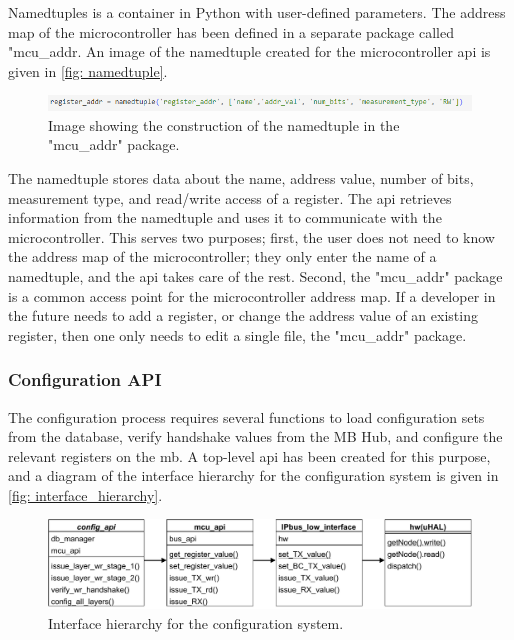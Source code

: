 \documentclass[main.tex]{subfiles}
\begin{document}
Namedtuples is a container in Python with user-defined parameters. The address map of the microcontroller has been defined in a separate package called "mcu\_addr. An image of the namedtuple created for the microcontroller \gls{api} is given in \autoref{fig: namedtuple}.


\begin{figure}[!ht]
    \centering
    \includegraphics[width=15cm, scale=4]{images/namedtuple.png}
    \caption{Image showing the construction of the namedtuple in the "mcu\_addr" package.}
    \label{fig: namedtuple}
\end{figure}
\FloatBarrier

The namedtuple stores data about the name, address value, number of bits, measurement type, and read/write access of a register. The \gls{api} retrieves information from the namedtuple and uses it to communicate with the microcontroller. This serves two purposes; first, the user does not need to know the address map of the microcontroller; they only enter the name of a namedtuple, and the \gls{api} takes care of the rest. Second, the "mcu\_addr" package is a common access point for the microcontroller address map. If a developer in the future needs to add a register, or change the address value of an existing register, then one only needs to edit a single file, the "mcu\_addr" package.


\subsubsection{Configuration API}

The configuration process requires several functions to load configuration sets from the database, verify handshake values from the MB Hub, and configure the relevant registers on the \gls{mb}. A top-level \gls{api} has been created for this purpose, and a diagram of the interface hierarchy for the configuration system is given in \autoref{fig: interface_hierarchy}.


\begin{figure}[!ht]
    \centering
    \includegraphics[width=15cm, scale=4]{images/interface_hierarchy.pdf}
    \caption{Interface hierarchy for the configuration system.}
    \label{fig: interface_hierarchy}
\end{figure}
\FloatBarrier
\end{document}

